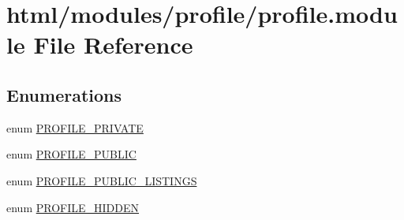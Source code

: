 \hypertarget{profile_8module}{
\section{html/modules/profile/profile.module File Reference}
\label{profile_8module}
}
\subsection*{Enumerations}
\begin{DoxyCompactItemize}
\item 
enum \hyperlink{profile_8module_a716a6e53d21c86799f2b81235a94e42e}{PROFILE\_\-PRIVATE} 
\item 
enum \hyperlink{profile_8module_ad05d09d0c6e6c43a423e51496f4435fd}{PROFILE\_\-PUBLIC} 
\item 
enum \hyperlink{profile_8module_a446618b936db915449e9bba63330ccd8}{PROFILE\_\-PUBLIC\_\-LISTINGS} 
\item 
enum \hyperlink{profile_8module_aa0cce9439e7000486ab39f1602fdd8ec}{PROFILE\_\-HIDDEN} 
\end{DoxyCompactItemize}

